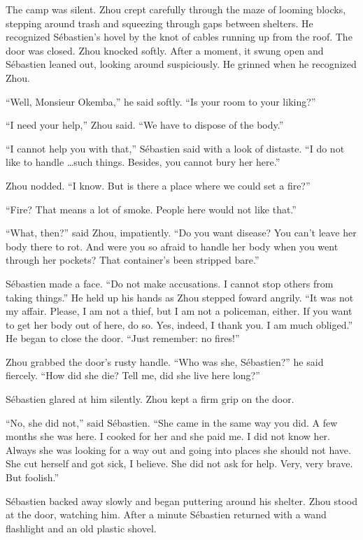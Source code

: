 \documentclass[10pt,b5paper]{article}
\begin{document}
The camp was silent. Zhou crept carefully through the maze of
looming blocks, stepping around trash and squeezing through gaps
between shelters. He recognized S\'{e}bastien's hovel by the knot of
cables running up from the roof. The door was closed. Zhou knocked
softly. After a moment, it swung open and S\'{e}bastien leaned out,
looking around suspiciously. He grinned when he recognized Zhou.

``Well, Monsieur Okemba,'' he said softly. ``Is your room to your
liking?''

``I need your help,'' Zhou said. ``We have to dispose of the body.''

``I cannot help you with that,'' S\'{e}bastien said with a look of
distaste. ``I do not like to handle \ldots such things.  Besides,
you cannot bury her here.''

Zhou nodded. ``I know. But is there a place where we could set a fire?''

``Fire? That means a lot of smoke. People here would not like that.''

``What, then?'' said Zhou, impatiently. ``Do you want disease? You
can't leave her body there to rot. And were you so afraid to handle
her body when you went through her pockets? That container's been
stripped bare.''

S\'{e}bastien made a face. ``Do not make accusations. I cannot stop
others from taking things.'' He held up his hands as Zhou
stepped foward angrily. ``It was not my affair. Please, I am not a
thief, but I am not a policeman, either. If you want to get her body
out of here, do so. Yes, indeed, I thank you. I am much obliged.''
He began to close the door. ``Just remember: no fires!''

Zhou grabbed the door's rusty handle. ``Who was she, S\'{e}bastien?'' he
said fiercely. ``How did she die? Tell me, did she live here long?''

S\'{e}bastien glared at him silently. Zhou kept a firm grip on the door.

``No, she did not,'' said S\'{e}bastien. ``She came in the same way you
did. A few months she was here. I cooked for her and she paid me. I
did not know her. Always she was looking for a way out and going
into places she should not have. She cut herself and got sick,
I believe. She did not ask for help. Very, very brave. But foolish.''

S\'{e}bastien backed away slowly and began puttering around his
shelter. Zhou stood at the door, watching him. After a minute
S\'{e}bastien returned with a wand flashlight and an old plastic shovel.
\end{document}
